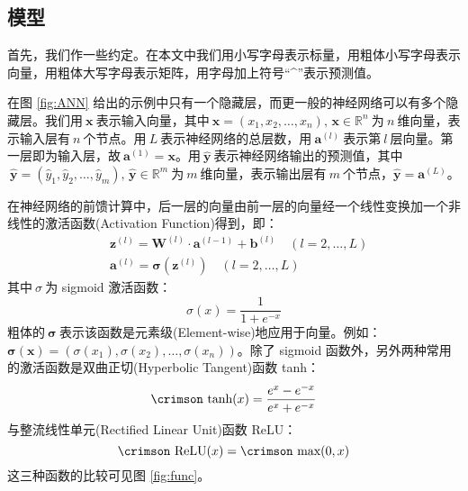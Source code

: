 \documentclass[12pt,a4paper]{article}
\begin{document}
\subsection{模型}

首先，我们作一些约定。在本文中我们用小写字母表示标量，用粗体小写字母表示向量，用粗体大写字母表示矩阵，用字母加上符号“\textasciicircum ”表示预测值。

在图 {\kai \ref{fig:ANN}} 给出的示例中只有一个隐藏层，而更一般的神经网络可以有多个隐藏层。我们用$\:\bm{x}\:$表示输入向量，其中$\:\bm{x} = (x_1,x_2,\ldots,x_n),\,\bm{x} \in \mathbb{R}^n\:$为$\:n\:$维向量，表示输入层有$\:n\:$个节点。用$\:L\:$表示神经网络的总层数，用$\:\bm{a}^{(l)}\:$表示第$\:l\:$层向量。第一层即为输入层，故$\:\bm{a}^{(1)} = \bm{x}$。用$\:\hat{\bm{y}}\:$表示神经网络输出的预测值，其中$\:\hat{\bm{y}} =( \hat{y}_1,\hat{y}_2,\ldots,\hat{y}_m),\,\hat{\bm{y}} \in \mathbb{R}^m\:$为$\:m\:$维向量，表示输出层有$\:m\:$个节点，$\hat{\bm{y}} = \bm{a}^{(L)}$。

在神经网络的前馈计算中，后一层的向量由前一层的向量经一个线性变换加一个非线性的{\hei 激活函数}({\crimson Activation Function})得到，即：
\begin{align}
&\bm{z}^{(l)} = \bm{W}^{(l)}\cdot\bm{a}^{(l-1)} + \bm{b}^{(l)} \quad (l = 2,\ldots,L) \\
&\bm{a}^{(l)} = \bm{\sigma}(\bm{z}^{(l)}) \quad (l = 2,\ldots,L)
\end{align}
其中$\:\sigma\:$为 {\crimson sigmoid} 激活函数：
\begin{equation}
\sigma(x) = \frac{1}{1 + e^{-x}}
\end{equation} 
粗体的$\:\bm{\sigma}\:$表示该函数是{\hei 元素级}({\crimson Element-wise})地应用于向量。例如：$\bm{\sigma}(\bm{x}) = (\sigma(x_1),\allowbreak\sigma(x_2),\ldots,\sigma(x_n))$。除了 {\crimson sigmoid} 函数外，另外两种常用的激活函数是{\hei 双曲正切}({\crimson Hyperbolic Tangent})函数 {\crimson tanh}：
\begin{equation}
\text{\crimson tanh}(x) = \frac{e^x - e^{-x}}{e^x + e^{-x}}
\end{equation} 
与{\hei 整流线性单元}({\crimson Rectified Linear Unit})函数 {\crimson ReLU}：
\begin{equation}
\text{\crimson ReLU}(x) = \text{\crimson max}(0, x)
\end{equation} 
这三种函数的比较可见图 {\kai \ref{fig:func}}。
\end{document}
